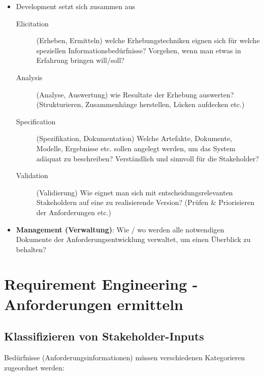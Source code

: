 \documentclass[a4paper]{article}
\begin{document}
		\begin{itemize}
			\item Development setzt sich zusammen aus
				\begin{description}
					\item[Elicitation] (Erheben, Ermitteln) welche Erhebungstechniken eignen sich für welche speziellen Informationsbedürfnisse?
					Vorgehen, wenn man etwas in Erfahrung bringen will/soll?
					\item[Analysis] (Analyse, Auswertung) wie Resultate der Erhebung auswerten? (Strukturieren, Zusammenhänge herstellen, Lücken aufdecken etc.)
					\item[Specification] (Spezifikation, Dokumentation) Welche Artefakte, Dokumente, Modelle, Ergebnisse etc. sollen angelegt werden, um das System adäquat zu beschreiben?
					Verständlich und sinnvoll für die Stakeholder?
					\item[Validation] (Validierung) Wie eignet man sich mit entscheidungsrelevanten Stakeholdern auf eine zu realisierende Version? (Prüfen \& Priorisieren der Anforderungen etc.)
				\end{description}
			\item \textbf{Management (Verwaltung)}: Wie / wo werden alle notwendigen Dokumente der Anforderungsentwicklung verwaltet, um einen Überblick zu behalten?
		\end{itemize}
		
	\section{Requirement Engineering - Anforderungen ermitteln}
	
		\subsection{Klassifizieren von Stakeholder-Inputs}
		
		Bedürfnisse (Anforderungsinformationen) müssen verschiedenen Kategorieren zugeordnet werden:
		
\end{document}
